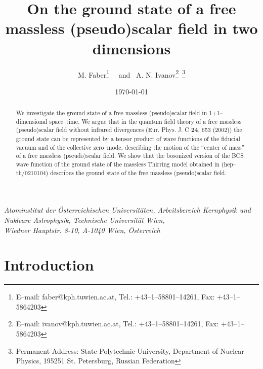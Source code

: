 \documentclass[a4paper,12pt] {article}
\begin{document}
\setcounter{page}{1}
\def\theequation{\arabic{section}.\arabic{equation}}
\def\theequation{\thesection.\arabic{equation}}
\setcounter{section}{0}

\title{On the ground state of a free massless (pseudo)scalar field in
two dimensions}

\author{M. Faber\thanks{E--mail: faber@kph.tuwien.ac.at, Tel.:
+43--1--58801--14261, Fax: +43--1--5864203} ~~and~
A. N. Ivanov\thanks{E--mail: ivanov@kph.tuwien.ac.at, Tel.:
+43--1--58801--14261, Fax: +43--1--5864203}~\thanks{Permanent Address:
State Polytechnic University, Department of Nuclear Physics, 195251
St. Petersburg, Russian Federation}}

\date{\today}

\maketitle
\vspace{-0.5in}
\begin{center}
{\it Atominstitut der \"Osterreichischen Universit\"aten,
Arbeitsbereich Kernphysik und Nukleare Astrophysik, Technische
Universit\"at Wien, \\ Wiedner Hauptstr. 8-10, A-1040 Wien,
\"Osterreich }
\end{center}

\begin{center}
\begin{abstract}
We investigate the ground state of a free massless (pseudo)scalar
field in 1+1--dimensional space--time. We argue that in the quantum
field theory of a free massless (pseudo)scalar field without infrared
divergences (Eur. Phys. J. C {\bf 24}, 653 (2002)) the ground state
can be represented by a tensor product of wave functions of the
fiducial vacuum and of the collective zero--mode, describing the
motion of the ``center of mass'' of a free massless (pseudo)scalar
field. We show that the bosonized version of the BCS wave function of
the ground state of the massless Thirring model obtained in
(hep--th/0210104) describes the ground state of the free massless
(pseudo)scalar field. 
\end{abstract}
\end{center}

\newpage

\section{Introduction}
\setcounter{equation}{0}
\end{document}
